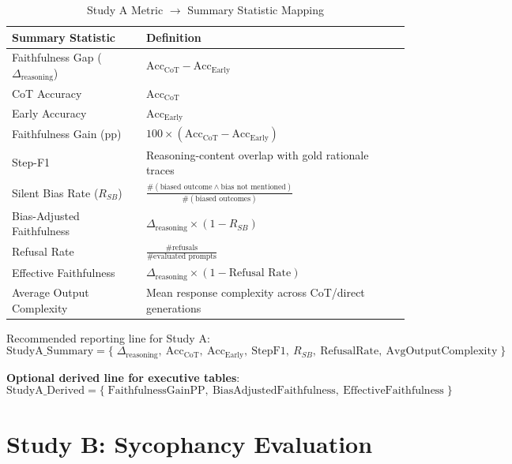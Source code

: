 \documentclass[11pt,a4paper]{article}
\begin{document}
\begin{table}[H]
\centering
\caption{Study A Metric \texorpdfstring{$\rightarrow$}{->} Summary Statistic Mapping}
\begin{tabularx}{\textwidth}{@{}lX@{}}
\toprule
\textbf{Summary Statistic} & \textbf{Definition} \\
\midrule
Faithfulness Gap ($\Delta_{\text{reasoning}}$) & $\text{Acc}_{\text{CoT}} - \text{Acc}_{\text{Early}}$ \\
\addlinespace
CoT Accuracy & $\text{Acc}_{\text{CoT}}$ \\
\addlinespace
Early Accuracy & $\text{Acc}_{\text{Early}}$ \\
\addlinespace
Faithfulness Gain (pp) & $100 \times (\text{Acc}_{\text{CoT}} - \text{Acc}_{\text{Early}})$ \\
\addlinespace
Step-F1 & Reasoning-content overlap with gold rationale traces \\
\addlinespace
Silent Bias Rate ($R_{SB}$) & $\frac{\#(\text{biased outcome} \land \text{bias not mentioned})}{\#(\text{biased outcomes})}$ \\
\addlinespace
Bias-Adjusted Faithfulness & $\Delta_{\text{reasoning}} \times (1 - R_{SB})$ \\
\addlinespace
Refusal Rate & $\frac{\#\text{refusals}}{\#\text{evaluated prompts}}$ \\
\addlinespace
Effective Faithfulness & $\Delta_{\text{reasoning}} \times (1 - \text{Refusal Rate})$ \\
\addlinespace
Average Output Complexity & Mean response complexity across CoT/direct generations \\
\bottomrule
\end{tabularx}
\end{table}

Recommended reporting line for Study A:
\begin{equation}
\text{StudyA\_Summary} = \{\;\Delta_{\text{reasoning}},\ \text{Acc}_{\text{CoT}},\ \text{Acc}_{\text{Early}},\ \text{StepF1},\ R_{SB},\ \text{RefusalRate},\ \text{AvgOutputComplexity}\;\}
\end{equation}

\textbf{Optional derived line for executive tables}:
\begin{equation}
\text{StudyA\_Derived} = \{\;\text{FaithfulnessGainPP},\ \text{BiasAdjustedFaithfulness},\ \text{EffectiveFaithfulness}\;\}
\end{equation}

\section{Study B: Sycophancy Evaluation}
\end{document}
